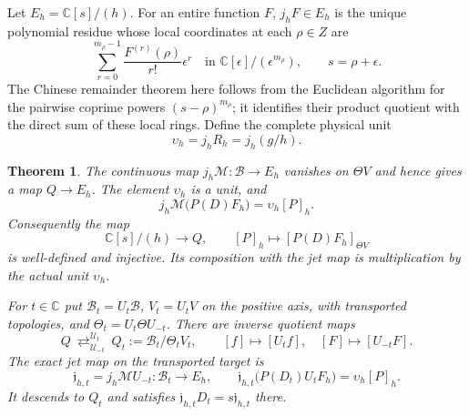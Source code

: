 \documentclass[11pt]{article}
\newcommand{\C}{\mathbb C}\newcommand{\R}{\mathbb R}
\newcommand{\B}{\mathscr B}\newcommand{\Epi}{\mathscr E_\pi}
\newcommand{\Mell}{\mathcal M}\newcommand{\Sch}{\mathcal S}
\newtheorem{theorem}{Theorem}[section]
\begin{document}
Let $E_h=\C[s]/(h)$. For an entire function $F$, $j_hF\in E_h$
is the unique polynomial residue whose local coordinates at each
$\rho\in Z$ are
\begin{equation}\label{eq:jets}
\sum_{r=0}^{m_\rho-1}\frac{F^{(r)}(\rho)}{r!}\epsilon^r
\quad\text{in }\C[\epsilon]/(\epsilon^{m_\rho}),\qquad s=\rho+\epsilon.
\end{equation}
The Chinese remainder theorem here follows from the Euclidean
algorithm for the pairwise coprime powers $(s-\rho)^{m_\rho}$;
it identifies their product quotient with the direct sum of these
local rings. Define the complete physical unit
\begin{equation}\label{eq:unit}
\upsilon_h=j_hR_h=j_h(g/h).
\end{equation}

\begin{theorem}\label{thm:jets}
The continuous map $j_h\Mell:\B\to E_h$ vanishes on $\Theta V$
and hence gives a map $Q\to E_h$. The element $\upsilon_h$ is
a unit, and
\begin{equation}\label{eq:physical-jet}
j_h\Mell\bigl(P(D)F_h\bigr)=\upsilon_h[P]_h.
\end{equation}
Consequently the map
\begin{equation}\label{eq:physical-injection}
\C[s]/(h)\longrightarrow Q,\qquad
[P]_h\longmapsto[P(D)F_h]_{\Theta V}
\end{equation}
is well-defined and injective. Its composition with the jet map is
multiplication by the actual unit $\upsilon_h$.

For $t\in\C$ put $\B_t=U_t\B$, $V_t=U_tV$ on the positive
axis, with transported topologies, and
$\Theta_t=U_t\Theta U_{-t}$. There are inverse quotient maps
\begin{equation}\label{eq:quotient-transport}
Q\ \mathop{\rightleftarrows}^{\mathcal U_t}_{\mathcal U_{-t}}\
Q_t:=\B_t/\Theta_tV_t,
\qquad [f]\mapsto[U_tf],\quad[F]\mapsto[U_{-t}F].
\end{equation}
The exact jet map on the transported target is
\begin{equation}\label{eq:transported-jet}
\mathfrak j_{h,t}=j_h\Mell U_{-t}:\B_t\longrightarrow E_h,
\qquad
\mathfrak j_{h,t}\bigl(P(D_t)U_tF_h\bigr)
=\upsilon_h[P]_h.
\end{equation}
It descends to $Q_t$ and satisfies
$\mathfrak j_{h,t}D_t=s\mathfrak j_{h,t}$ there.
\end{theorem}
\end{document}
